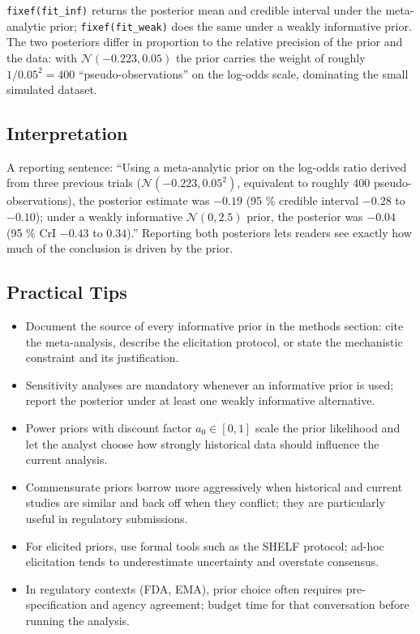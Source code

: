 \documentclass[
]{article}
\providecommand{\tightlist}{%
  \setlength{\itemsep}{0pt}\setlength{\parskip}{0pt}}
\begin{document}
\texttt{fixef(fit\_inf)} returns the posterior mean and credible
interval under the meta-analytic prior; \texttt{fixef(fit\_weak)} does
the same under a weakly informative prior. The two posteriors differ in
proportion to the relative precision of the prior and the data: with
\(\mathcal N(-0.223, 0.05)\) the prior carries the weight of roughly
\(1 / 0.05^2 = 400\) ``pseudo-observations'' on the log-odds scale,
dominating the small simulated dataset.

\subsection{Interpretation}\label{interpretation}

A reporting sentence: ``Using a meta-analytic prior on the log-odds
ratio derived from three previous trials
(\(\mathcal N(-0.223, 0.05^2)\), equivalent to roughly 400
pseudo-observations), the posterior estimate was \(-0.19\) (95 \%
credible interval \(-0.28\) to \(-0.10\)); under a weakly informative
\(\mathcal N(0, 2.5)\) prior, the posterior was \(-0.04\) (95 \% CrI
\(-0.43\) to \(0.34\)).'' Reporting both posteriors lets readers see
exactly how much of the conclusion is driven by the prior.

\subsection{Practical Tips}\label{practical-tips}

\begin{itemize}
\tightlist
\item
  Document the source of every informative prior in the methods section:
  cite the meta-analysis, describe the elicitation protocol, or state
  the mechanistic constraint and its justification.
\item
  Sensitivity analyses are mandatory whenever an informative prior is
  used; report the posterior under at least one weakly informative
  alternative.
\item
  Power priors with discount factor \(a_0 \in [0, 1]\) scale the prior
  likelihood and let the analyst choose how strongly historical data
  should influence the current analysis.
\item
  Commensurate priors borrow more aggressively when historical and
  current studies are similar and back off when they conflict; they are
  particularly useful in regulatory submissions.
\item
  For elicited priors, use formal tools such as the SHELF protocol;
  ad-hoc elicitation tends to underestimate uncertainty and overstate
  consensus.
\item
  In regulatory contexts (FDA, EMA), prior choice often requires
  pre-specification and agency agreement; budget time for that
  conversation before running the analysis.
\end{itemize}
\end{document}
